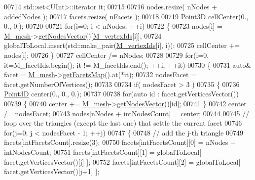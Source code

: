 \begin{DoxyCode}
00714         std::set<UInt>::iterator it;
00715 
00716         nodes.resize( nNodes + addedNodes );
00717         facets.resize( nFacets );
00718 
00719         \hyperlink{classFVCode3D_1_1Point3D}{Point3D} cellCenter(0., 0., 0.);
00720 
00721         \textcolor{keywordflow}{for}(i=0; i < nNodes; ++i)
00722         \{
00723             nodes[i] = \hyperlink{classFVCode3D_1_1Mesh3D_1_1Cell3D_a5f593479ad61eb1a043b7ec977db39bb}{M\_mesh}->\hyperlink{classFVCode3D_1_1Mesh3D_a04162ec60e0fe52674b3ecbb7de1185c}{getNodesVector}()[\hyperlink{classFVCode3D_1_1Mesh3D_1_1Cell3D_a1c43369fa1a00208ff3293aad35a70aa}{M\_vertexIds}[i]];
00724             globalToLocal.insert(std::make\_pair(\hyperlink{classFVCode3D_1_1Mesh3D_1_1Cell3D_a1c43369fa1a00208ff3293aad35a70aa}{M\_vertexIds}[i], i));
00725             cellCenter += nodes[i];
00726         \}
00727         cellCenter /= nNodes;
00728 
00729         \textcolor{keywordflow}{for}(i=0, it=M\_facetIds.begin(); it != M\_facetIds.end(); ++i, ++it)
00730         \{
00731             \textcolor{keyword}{auto}& facet = \hyperlink{classFVCode3D_1_1Mesh3D_1_1Cell3D_a5f593479ad61eb1a043b7ec977db39bb}{M\_mesh}->\hyperlink{classFVCode3D_1_1Mesh3D_a76de387da2a552e3e1210d795bc7acf9}{getFacetsMap}().at(*it);
00732             nodesFacet = facet.getNumberOfVertices();
00733 
00734             \textcolor{keywordflow}{if}( nodesFacet > 3 )
00735             \{
00736                 \hyperlink{classFVCode3D_1_1Point3D}{Point3D} center(0., 0., 0.);
00737 
00738                 \textcolor{keywordflow}{for}(\textcolor{keyword}{auto} \textcolor{keywordtype}{id} : facet.getVerticesVector())
00739                 \{
00740                     center += \hyperlink{classFVCode3D_1_1Mesh3D_1_1Cell3D_a5f593479ad61eb1a043b7ec977db39bb}{M\_mesh}->\hyperlink{classFVCode3D_1_1Mesh3D_a04162ec60e0fe52674b3ecbb7de1185c}{getNodesVector}()[id];
00741                 \}
00742                 center /= nodesFacet;
00743                 nodes[nNodes + intNodesCount] = center;
00744 
00745                 \textcolor{comment}{// loop over the triangles (except the last one) that settle the current facet}
00746                 \textcolor{keywordflow}{for}(j=0; j < nodesFacet - 1; ++j)
00747                 \{
00748                     \textcolor{comment}{// add the j-th triangle}
00749                     facets[intFacetsCount].resize(3);
00750                     facets[intFacetsCount][0] = nNodes + intNodesCount;
00751                     facets[intFacetsCount][1] = globalToLocal[ facet.getVerticesVector()[j] ];
00752                     facets[intFacetsCount][2] = globalToLocal[ facet.getVerticesVector()[j+1] ];

\end{DoxyCode}
